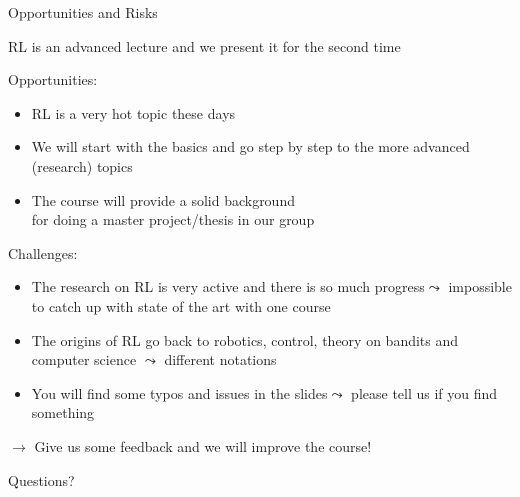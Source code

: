 \documentclass[aspectratio=169]{../latex_main/tntbeamer}  %
\begin{document}
\begin{frame}[c]{Opportunities and Risks}
	
	\vspace{-1em}
	RL is an advanced lecture and we present it for the second time
	
	\medskip
	\pause
	
	Opportunities:
	\begin{itemize}
		\item RL is a very hot topic these days
		\item We will start with the basics and go step by step to the more advanced (research) topics
		\item The course will provide a solid background\\ for doing a master project/thesis in our group 
	\end{itemize}
	
	\pause
	
	Challenges:
	\begin{itemize}
		\item The research on RL is very active and there is so much progress\newline $\leadsto$ impossible to catch up with state of the art with one course
		\item The origins of RL go back to robotics, control, theory on bandits and computer science $\leadsto$ different notations
		\item You will find some typos and issues in the slides\newline $\leadsto$ please tell us if you find something
	\end{itemize}
	
	\pause
	$\to$ Give us some feedback and we will improve the course!
	
	
\end{frame}

\begin{frame}[c]{}
	
	\centering
	\huge
	Questions?
	
\end{frame}


\end{document}
